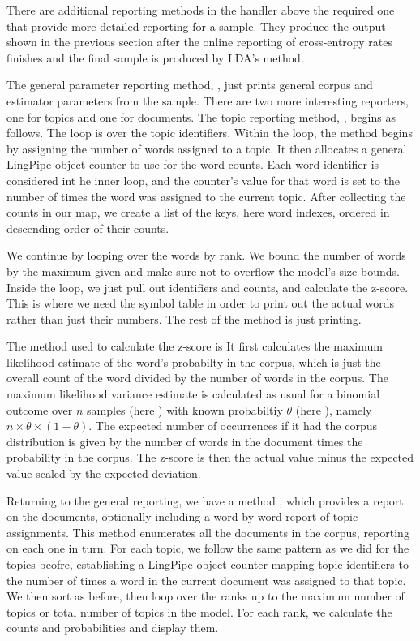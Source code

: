 There are additional reporting methods in the handler above the
required one that provide more detailed reporting for a sample.  They
produce the output shown in the previous section after the online
reporting of cross-entropy rates finishes and the final sample is
produced by LDA's  method.

The general parameter reporting method, ,
just prints general corpus and estimator parameters from the sample.
There are two more interesting reporters, one for topics and one for
documents.  The topic reporting method, ,
begins as follows.
%
%
The loop is over the topic identifiers.  Within the loop, the method
begins by assigning the number of words assigned to a topic.  It then
allocates a general LingPipe object counter to use for the word
counts.  Each word identifier is considered int he inner loop, and the
counter's value for that word is set to the number of times the word
was assigned to the current topic.  After collecting the counts in our
map, we create a list of the keys, here word indexes, ordered in
descending order of their counts.  

We continue by looping over the words by rank.
%
%
We bound the number of words by the maximum given and make sure not to
overflow the model's size bounds.  Inside the loop, we just pull out
identifiers and counts, and calculate the z-score.  This is where we
need the symbol table in order to print out the actual words rather
than just their numbers.  The rest of the method is just printing.

The method used to calculate the z-score is
%
%
It first calculates the maximum likelihood estimate of the word's
probabilty in the corpus, which is just the overall count of the word
divided by the number of words in the corpus.  The maximum likelihood
variance estimate is calculated as usual for a binomial outcome over
$n$ samples (here ) with known probabiltiy
$\theta$ (here ), namely $n \times \theta \times (1 -
\theta)$.  The expected number of occurrences if it had the corpus
distribution is given by the number of words in the document times the
probability in the corpus.  The z-score is then the actual value minus
the expected value scaled by the expected deviation.

Returning to the general reporting, we have a method
, which provides a report on the documents,
optionally including a word-by-word report of topic assignments.
%
%
This method enumerates all the documents in the corpus, reporting on
each one in turn.  For each topic, we follow the same pattern as we
did for the topics beofre, establishing a LingPipe object counter
mapping topic identifiers to the number of times a word in the current
document was assigned to that topic.  We then sort as before, then
loop over the ranks up to the maximum number of topics or total number
of topics in the model.
%
%
For each rank, we calculate the counts and probabilities and display
them.

